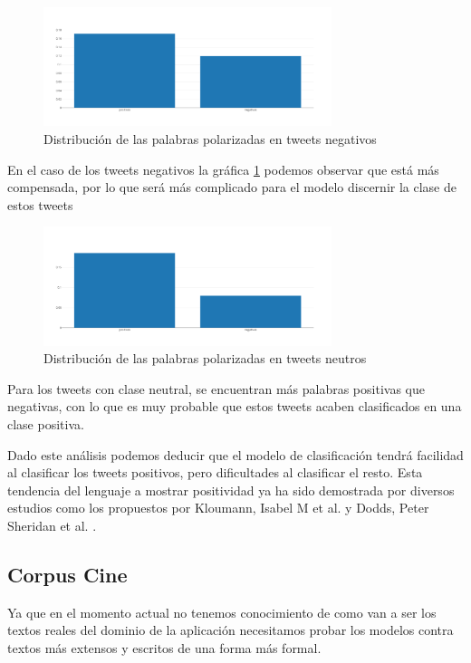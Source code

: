 \begin{figure}[H]
	\centering
	\includegraphics[width=0.75\textwidth]{imaxes/dist_pos_neg_neg.png}
	\caption{Distribución de las palabras polarizadas en tweets negativos}
	\label{dist_neg}
\end{figure}

En el caso de los tweets negativos la gráfica \ref{dist_neg} podemos observar que está más compensada, por lo que será más complicado para el modelo discernir la clase de estos tweets

\begin{figure}[!ht]
	\centering
	\includegraphics[width=0.75\textwidth]{imaxes/dist_pos_neg_neut.png}
	\caption{Distribución de las palabras polarizadas en tweets neutros}
	\label{dist_neut}
\end{figure}

Para los tweets con clase neutral, se encuentran más palabras positivas que negativas, con lo que es muy probable que estos tweets acaben clasificados en una clase positiva.

Dado este análisis podemos deducir que el modelo de clasificación tendrá facilidad al clasificar los tweets positivos, pero dificultades al clasificar el resto. Esta tendencia del lenguaje a mostrar positividad ya ha sido demostrada por diversos estudios como los propuestos por Kloumann, Isabel M et al. \cite{PoeEL} y Dodds, Peter Sheridan et al. \cite{HulPB}.

\subsection{Corpus Cine}

Ya que en el momento actual no tenemos conocimiento de como van a ser los textos reales del dominio de la aplicación necesitamos probar los modelos contra textos más extensos y escritos de una forma más formal.

